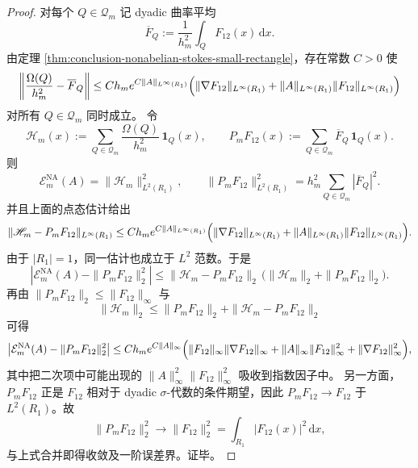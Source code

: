 \begin{proof}
对每个 \(Q\in\mathcal Q_m\) 记 dyadic 曲率平均
\[
\overline F_Q
:=
\frac1{h_m^2}\int_Q F_{12}(x)\,\mathrm d x.
\]
由定理 \ref{thm:conclusion-nonabelian-stokes-small-rectangle}，存在常数 \(C>0\) 使
\[
\left\|
\frac{\Omega(Q)}{h_m^2}-\overline F_Q
\right\|
\le
C h_m e^{C\|A\|_{L^\infty(R_1)}}
\Bigl(
\|\nabla F_{12}\|_{L^\infty(R_1)}
+\|A\|_{L^\infty(R_1)}\|F_{12}\|_{L^\infty(R_1)}
\Bigr)
\]
对所有 \(Q\in\mathcal Q_m\) 同时成立。
令
\[
\mathscr H_m(x)
:=
\sum_{Q\in\mathcal Q_m}\frac{\Omega(Q)}{h_m^2}\,\mathbf 1_Q(x),
\qquad
P_mF_{12}(x)
:=
\sum_{Q\in\mathcal Q_m}\overline F_Q\,\mathbf 1_Q(x).
\]
则
\[
\mathcal E_m^{\mathrm{NA}}(A)=\|\mathscr H_m\|_{L^2(R_1)}^2,
\qquad
\|P_mF_{12}\|_{L^2(R_1)}^2
=
h_m^2\sum_{Q\in\mathcal Q_m}|\overline F_Q|^2.
\]
并且上面的点态估计给出
\[
\|\mathscr H_m-P_mF_{12}\|_{L^\infty(R_1)}
\le
C h_m e^{C\|A\|_{L^\infty(R_1)}}
\Bigl(
\|\nabla F_{12}\|_{L^\infty(R_1)}
+\|A\|_{L^\infty(R_1)}\|F_{12}\|_{L^\infty(R_1)}
\Bigr).
\]
由于 \(|R_1|=1\)，同一估计也成立于 \(L^2\) 范数。于是
\[
\left|
\mathcal E_m^{\mathrm{NA}}(A)-\|P_mF_{12}\|_2^2
\right|
\le
\|\mathscr H_m-P_mF_{12}\|_2\,
\bigl(\|\mathscr H_m\|_2+\|P_mF_{12}\|_2\bigr).
\]
再由 \(\|P_mF_{12}\|_2\le \|F_{12}\|_\infty\) 与
\[
\|\mathscr H_m\|_2
\le
\|P_mF_{12}\|_2+\|\mathscr H_m-P_mF_{12}\|_2
\]
可得
\[
\left|
\mathcal E_m^{\mathrm{NA}}(A)-\|P_mF_{12}\|_2^2
\right|
\le
C h_m e^{C\|A\|_\infty}
\Bigl(
\|F_{12}\|_\infty\|\nabla F_{12}\|_\infty
+\|A\|_\infty\|F_{12}\|_\infty^2
+\|\nabla F_{12}\|_\infty^2
\Bigr),
\]
其中把二次项中可能出现的 \(\|A\|_\infty^2\|F_{12}\|_\infty^2\) 吸收到指数因子中。
另一方面，\(P_mF_{12}\) 正是 \(F_{12}\) 相对于 dyadic \(\sigma\)-代数的条件期望，因此 \(P_mF_{12}\to F_{12}\) 于 \(L^2(R_1)\)。故
\[
\|P_mF_{12}\|_2^2\longrightarrow \|F_{12}\|_2^2
=
\int_{R_1}|F_{12}(x)|^2\,\mathrm d x,
\]
与上式合并即得收敛及一阶误差界。证毕。
\end{proof}

